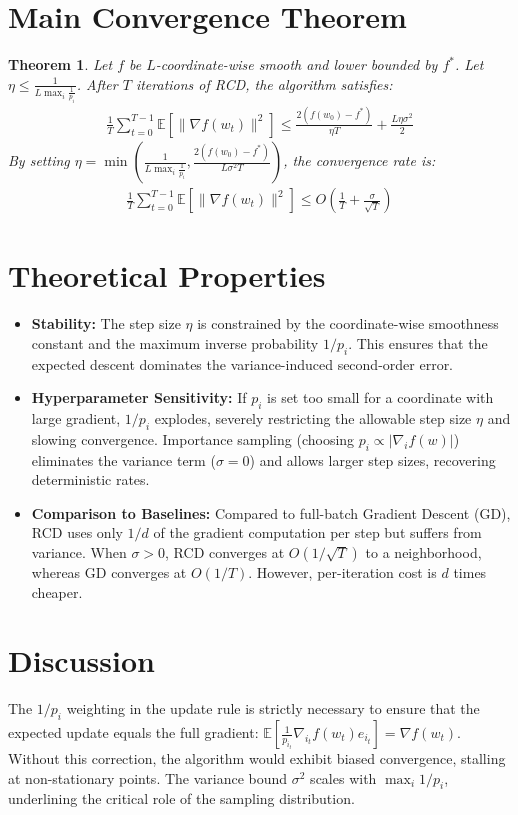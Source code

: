 \documentclass{article}
\newtheorem{theorem}{Theorem}
\begin{document}
\section*{Main Convergence Theorem}
\begin{theorem}
Let $f$ be $L$-coordinate-wise smooth and lower bounded by $f^*$. Let $\eta \leq \frac{1}{L \max_i \frac{1}{p_i}}$. After $T$ iterations of RCD, the algorithm satisfies:
\begin{align*}
    \frac{1}{T} \sum_{t=0}^{T-1} \mathbb{E}[\|\nabla f(w_t)\|^2] \leq \frac{2(f(w_0) - f^*)}{\eta T} + \frac{L \eta \sigma^2}{2}
\end{align*}
By setting $\eta = \min\left( \frac{1}{L \max_i \frac{1}{p_i}}, \frac{2(f(w_0)-f^*)}{L \sigma^2 T} \right)$, the convergence rate is:
\begin{align*}
    \frac{1}{T} \sum_{t=0}^{T-1} \mathbb{E}[\|\nabla f(w_t)\|^2] \leq O\left(\frac{1}{T} + \frac{\sigma}{\sqrt{T}}\right)
\end{align*}
\end{theorem}

\section*{Theoretical Properties}
\begin{itemize}
    \item \textbf{Stability:} The step size $\eta$ is constrained by the coordinate-wise smoothness constant and the maximum inverse probability $1/p_i$. This ensures that the expected descent dominates the variance-induced second-order error.
    \item \textbf{Hyperparameter Sensitivity:} If $p_i$ is set too small for a coordinate with large gradient, $1/p_i$ explodes, severely restricting the allowable step size $\eta$ and slowing convergence. Importance sampling (choosing $p_i \propto |\nabla_i f(w)|$) eliminates the variance term ($\sigma=0$) and allows larger step sizes, recovering deterministic rates.
    \item \textbf{Comparison to Baselines:} Compared to full-batch Gradient Descent (GD), RCD uses only $1/d$ of the gradient computation per step but suffers from variance. When $\sigma > 0$, RCD converges at $O(1/\sqrt{T})$ to a neighborhood, whereas GD converges at $O(1/T)$. However, per-iteration cost is $d$ times cheaper.
\end{itemize}

\section*{Discussion}
The $1/p_i$ weighting in the update rule is strictly necessary to ensure that the expected update equals the full gradient: $\mathbb{E}[\frac{1}{p_{i_t}} \nabla_{i_t} f(w_t) e_{i_t}] = \nabla f(w_t)$. Without this correction, the algorithm would exhibit biased convergence, stalling at non-stationary points. The variance bound $\sigma^2$ scales with $\max_i 1/p_i$, underlining the critical role of the sampling distribution.
\end{document}
